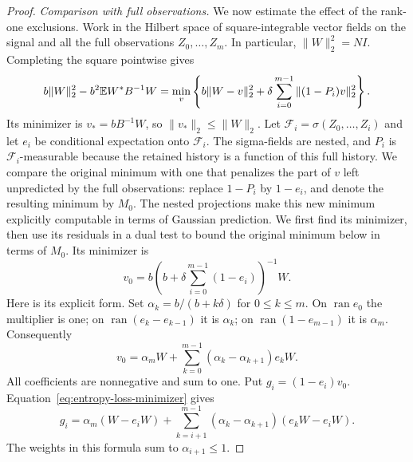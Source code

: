 \begin{proof}
\emph{Comparison with full observations.}
We now estimate the effect of the rank-one exclusions. Work in the
Hilbert space of square-integrable vector fields on the signal and all
the full observations $Z_0,\ldots,Z_m$.  In particular,
$\|W\|_2^2=NI$.  Completing the square pointwise gives
\begin{equation}
 b\|W\|_2^2-b^2\mathbb E W^*B^{-1}W
 =\min_v\left\{b\|W-v\|_2^2+
              \delta\sum_{i=0}^{m-1}\|(1-P_i)v\|_2^2\right\}.
 \label{eq:entropy-loss-variational}
\end{equation}
Its minimizer is $v_*=bB^{-1}W$, so $\|v_*\|_2\le\|W\|_2$.
Let $\mathcal F_i=\sigma(Z_0,\ldots,Z_i)$ and let $e_i$ be
conditional expectation onto $\mathcal F_i$.  The sigma-fields are
nested, and $P_i$ is $\mathcal F_i$-measurable because the retained
history is a function of this full history. We compare the original
minimum with one that penalizes the part of $v$ left unpredicted by
the full observations: replace $1-P_i$ by $1-e_i$, and denote the
resulting minimum by $M_0$. The nested projections make this new
minimum explicitly computable in terms of Gaussian prediction.
We first find its minimizer, then use its residuals in a dual test
to bound the original minimum below in terms of $M_0$.
Its minimizer is
\[
 v_0=b\left(b+\delta\sum_{i=0}^{m-1}(1-e_i)\right)^{-1}W.
\]
Here is its explicit form.  Set $\alpha_k=b/(b+k\delta)$ for
$0\le k\le m$.  On $\operatorname{ran}e_0$ the multiplier is one;
on $\operatorname{ran}(e_k-e_{k-1})$ it is $\alpha_k$; on
$\operatorname{ran}(1-e_{m-1})$ it is $\alpha_m$.  Consequently
\begin{equation}
 v_0=\alpha_mW+
       \sum_{k=0}^{m-1}(\alpha_k-\alpha_{k+1})e_kW.
 \label{eq:entropy-loss-minimizer}
\end{equation}
All coefficients are nonnegative and sum to one.  Put
$g_i=(1-e_i)v_0$.  Equation~\eqref{eq:entropy-loss-minimizer} gives
\begin{equation}
 g_i=\alpha_m(W-e_iW)+
 \sum_{k=i+1}^{m-1}(\alpha_k-\alpha_{k+1})(e_kW-e_iW).
 \label{eq:entropy-loss-residual}
\end{equation}
The weights in this formula sum to $\alpha_{i+1}\le1$.


\end{proof}
